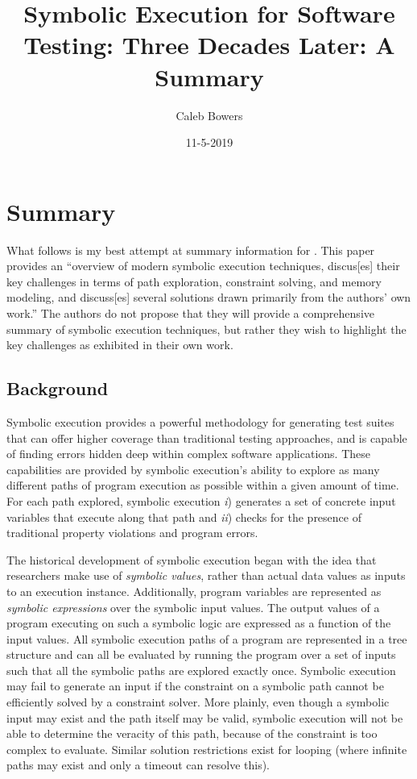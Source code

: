 \documentclass[11pt, journal]{IEEEtran}
\title{Symbolic Execution for Software Testing: Three Decades Later: A Summary}
\author{Caleb Bowers}
\date{11-5-2019}
\begin{document}
\begin{titlingpage}
\maketitle
\end{titlingpage}

\section{Summary}
What follows is my best attempt at summary information for \cite{Cadar2013}. This paper provides an ``overview of modern symbolic execution techniques, discus[es] their key challenges in terms of path exploration, constraint solving, and memory modeling, and discuss[es] several solutions drawn primarily from the authors' own work.'' The authors do not propose that they will provide a comprehensive summary of symbolic execution techniques, but rather they wish to highlight the key challenges as exhibited in their own work.
\subsection{Background}
Symbolic execution provides a powerful methodology for generating test suites that can offer higher coverage than traditional testing approaches, and is capable of finding errors hidden deep within complex software applications. These capabilities are provided by symbolic execution's ability to explore as many different paths of program execution as possible within a given amount of time. For each path explored, symbolic execution \textit{i}) generates a set of concrete input variables that execute along that path and \textit{ii}) checks for the presence of traditional property violations and program errors.

The historical development of symbolic execution began with the idea that researchers make use of \textit{symbolic values}, rather than actual data values as inputs to an execution instance. Additionally, program variables are represented as \textit{symbolic expressions} over the symbolic input values. The output values of a program executing on such a symbolic logic are expressed as a function of the input values. All symbolic execution paths of a program are represented in a tree structure and can all be evaluated by running the program over a set of inputs such that all the symbolic paths are explored exactly once. Symbolic execution may fail to generate an input if the constraint on a symbolic path cannot be efficiently solved by a constraint solver. More plainly, even though a symbolic input may exist and the path itself may be valid, symbolic execution will not be able to determine the veracity of this path, because of the constraint is too complex to evaluate. Similar solution restrictions exist for looping (where infinite paths may exist and only a timeout can resolve this).
\end{document}
